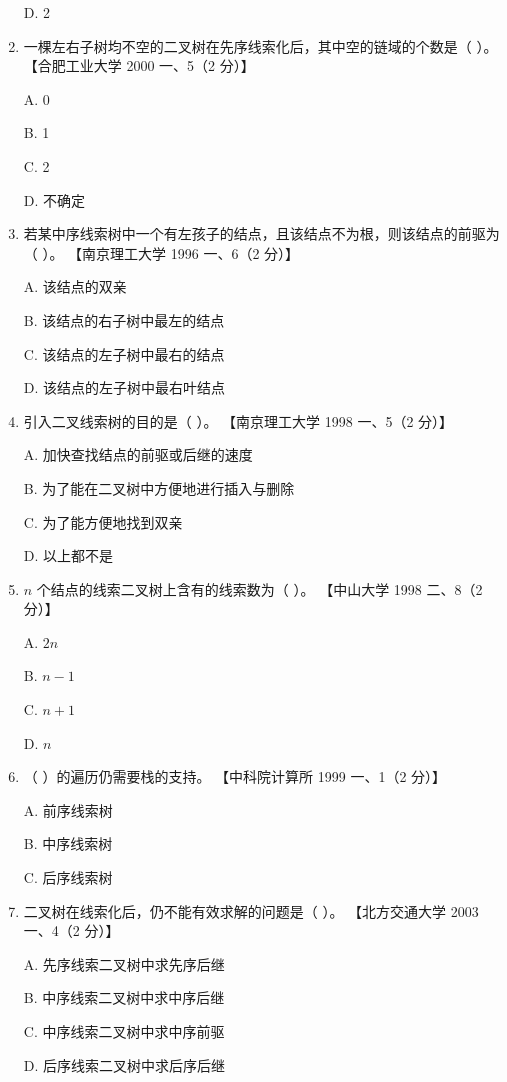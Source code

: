 \documentclass[lang=cn,newtx,10pt,scheme=chinese]{elegantbook}
\begin{document}
\begin{enumerate}
    D. 2  

    \item 一棵左右子树均不空的二叉树在先序线索化后，其中空的链域的个数是（ ）。  
    【合肥工业大学 2000 一、5（2 分）】  

    A. 0  

    B. 1 

    C. 2  

    D. 不确定  

    \item 若某中序线索树中一个有左孩子的结点，且该结点不为根，则该结点的前驱为（ ）。  
    【南京理工大学 1996 一、6（2 分）】  

    A. 该结点的双亲  

    B. 该结点的右子树中最左的结点  

    C. 该结点的左子树中最右的结点  

    D. 该结点的左子树中最右叶结点  

    \item 引入二叉线索树的目的是（ ）。  
    【南京理工大学 1998 一、5（2 分）】

    A. 加快查找结点的前驱或后继的速度  

    B. 为了能在二叉树中方便地进行插入与删除  

    C. 为了能方便地找到双亲  

    D. 以上都不是  

    \item $n$ 个结点的线索二叉树上含有的线索数为（ ）。  
    【中山大学 1998 二、8（2 分）】  

    A. $2n$  

    B. $n - 1$  

    C. $n+1$  

    D. $n$  

    \item （ ）的遍历仍需要栈的支持。  
    【中科院计算所 1999 一、1（2 分）】  

    A. 前序线索树  

    B. 中序线索树  

    C. 后序线索树  

    \item 二叉树在线索化后，仍不能有效求解的问题是（ ）。  
    【北方交通大学 2003 一、4（2 分）】 

    A. 先序线索二叉树中求先序后继  

    B. 中序线索二叉树中求中序后继  

    C. 中序线索二叉树中求中序前驱 

    D. 后序线索二叉树中求后序后继  


\end{enumerate}
\end{document}
